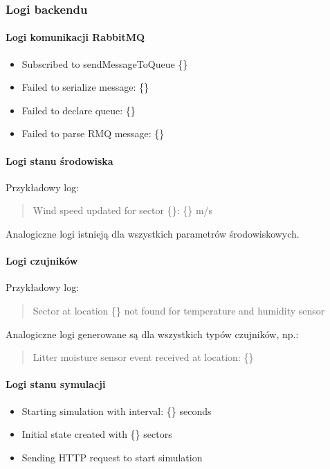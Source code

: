 \subsubsection{Logi backendu}

\paragraph{Logi komunikacji RabbitMQ}

\begin{itemize}
    \item Subscribed to sendMessageToQueue \{\}
    \item Failed to serialize message: \{\}
    \item Failed to declare queue: \{\}
    \item Failed to parse RMQ message: \{\}
\end{itemize}

\paragraph{Logi stanu środowiska}

Przykładowy log:
\begin{quote}
Wind speed updated for sector \{\}: \{\} m/s
\end{quote}

Analogiczne logi istnieją dla wszystkich parametrów środowiskowych.

\paragraph{Logi czujników}

Przykładowy log:
\begin{quote}
Sector at location \{\} not found for temperature and humidity sensor
\end{quote}

Analogiczne logi generowane są dla wszystkich typów czujników, np.:
\begin{quote}
Litter moisture sensor event received at location: \{\}
\end{quote}

\paragraph{Logi stanu symulacji}

\begin{itemize}
    \item Starting simulation with interval: \{\} seconds
    \item Initial state created with \{\} sectors
    \item Sending HTTP request to start simulation
\end{itemize}

